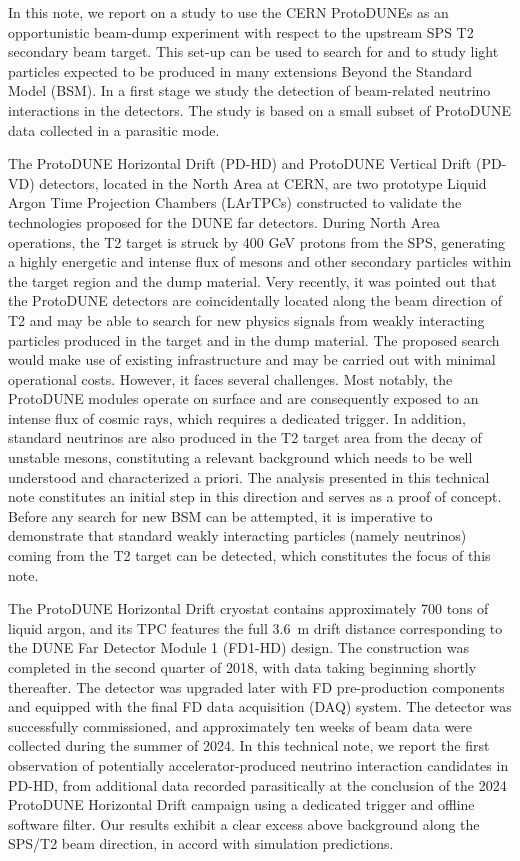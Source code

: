 In this note, we report on a study to use the CERN ProtoDUNEs as an opportunistic beam-dump experiment with respect to the  upstream SPS T2 secondary beam target. This set-up can be used to search for and to study light particles expected to be produced in many extensions Beyond the Standard Model (BSM). In a first stage we study the detection of beam-related neutrino interactions in the detectors. The study is based on a small subset of ProtoDUNE data collected in a parasitic mode. 

The ProtoDUNE Horizontal Drift (PD-HD) and ProtoDUNE Vertical Drift (PD-VD) detectors, located in the North Area at CERN, are two prototype Liquid Argon Time Projection Chambers (LArTPCs) constructed to validate the technologies proposed for the DUNE far detectors. During North Area operations, the T2 target is struck by 400 GeV protons from the SPS, generating a highly energetic and intense flux of mesons and other secondary particles within the target region and the dump material. Very recently, it was pointed out \cite{coloma2024new} that the ProtoDUNE detectors are coincidentally located along the beam direction of T2 and may be able to search for new physics signals from weakly interacting particles produced in the target and in the dump material. The proposed search would make use of existing infrastructure and may be carried out with minimal operational costs. However, it faces several challenges. Most notably, the ProtoDUNE modules operate on surface and are consequently exposed to an intense flux of cosmic rays, which requires a dedicated trigger. In addition, standard neutrinos are also produced in the T2 target area from the decay of unstable mesons, constituting a relevant background which needs to be well understood and characterized a priori. The analysis presented in this technical note constitutes an initial step in this direction and serves as a proof of concept. Before any search for new BSM can be attempted, it is imperative to demonstrate that standard weakly interacting
particles (namely neutrinos) coming from the T2 target can be detected, which constitutes the focus of this note.

The ProtoDUNE Horizontal Drift cryostat contains approximately 700 tons of liquid argon, and its TPC features the full 3.6~m drift distance corresponding to the DUNE Far Detector Module 1 (FD1-HD) design. The construction was completed in the second quarter of 2018, with data taking beginning shortly thereafter. The detector was upgraded later with FD pre-production components and equipped with the final FD data acquisition (DAQ) system. The detector was successfully commissioned, and approximately ten weeks of beam data were collected during the summer of 2024. In this technical note, we report the first observation of potentially accelerator-produced neutrino interaction candidates in PD-HD, from additional data recorded parasitically at the conclusion of the 2024 ProtoDUNE Horizontal Drift campaign using a dedicated trigger and offline software filter. Our results exhibit a clear excess above background along the SPS/T2 beam direction, in accord with simulation predictions.

